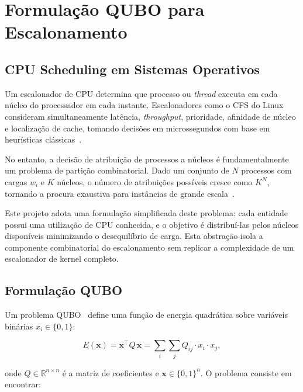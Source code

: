 \chapter{Formulação QUBO para Escalonamento}
\label{chap:formulacao-qubo-escalonamento}

\section{CPU Scheduling em Sistemas Operativos}
\label{sec:cpu-scheduling}

Um escalonador de \acs{CPU} determina que processo ou \textit{thread} executa em cada núcleo do processador
em cada instante. Escalonadores como o \ac{CFS} do Linux consideram
simultaneamente latência, \textit{throughput}, prioridade, afinidade de núcleo e localização de cache,
tomando decisões em microssegundos com base em heurísticas clássicas~\cite{LinuxCFS}.

No entanto, a decisão de atribuição de processos a núcleos é fundamentalmente um problema de partição combinatorial. Dado um conjunto de $N$ processos com cargas $w_i$ e $K$ núcleos, o número de atribuições possíveis cresce como $K^N$, tornando a procura exaustiva para instâncias de grande escala~\cite{Kochenberger2014QUBO,Glover2019QUBO}.

Este projeto adota uma formulação simplificada deste problema: cada entidade possui
uma utilização de \acs{CPU} conhecida, e o objetivo é distribuí-las pelos núcleos disponíveis minimizando o
desequilíbrio de carga. Esta abstração isola a componente combinatorial do escalonamento sem replicar a complexidade de um escalonador de kernel completo.

\section{Formulação QUBO}
\label{sec:formulacao-qubo}

Um problema \acs{QUBO}~\cite{Kochenberger2014QUBO,Glover2019QUBO} define uma função
de energia quadrática sobre variáveis binárias $x_i \in \{0, 1\}$:

\begin{equation}
    E(\mathbf{x}) = \mathbf{x}^\top Q\, \mathbf{x} = \sum_{i} \sum_{j} Q_{ij} \cdot x_i \cdot x_j,
    \label{eq:energia-qubo}
\end{equation}

onde $Q \in \mathbb{R}^{n \times n}$ é a matriz de coeficientes e $\mathbf{x} \in \{0,1\}^n$.
O problema consiste em encontrar:

